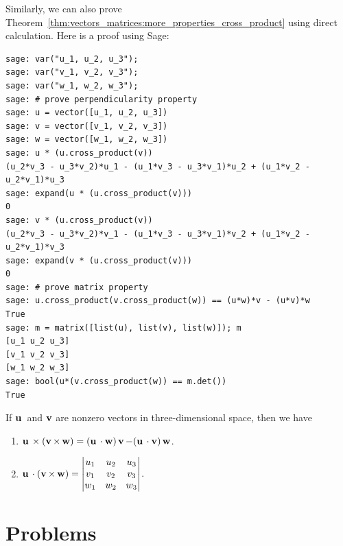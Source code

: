 Similarly, we can also prove
Theorem~\ref{thm:vectors_matrices:more_properties_cross_product} using
direct calculation. Here is a proof using Sage:
%
\begin{lstlisting}
sage: var("u_1, u_2, u_3");
sage: var("v_1, v_2, v_3");
sage: var("w_1, w_2, w_3");
sage: # prove perpendicularity property
sage: u = vector([u_1, u_2, u_3])
sage: v = vector([v_1, v_2, v_3])
sage: w = vector([w_1, w_2, w_3])
sage: u * (u.cross_product(v))
(u_2*v_3 - u_3*v_2)*u_1 - (u_1*v_3 - u_3*v_1)*u_2 + (u_1*v_2 - u_2*v_1)*u_3
sage: expand(u * (u.cross_product(v)))
0
sage: v * (u.cross_product(v))
(u_2*v_3 - u_3*v_2)*v_1 - (u_1*v_3 - u_3*v_1)*v_2 + (u_1*v_2 - u_2*v_1)*v_3
sage: expand(v * (u.cross_product(v)))
0
sage: # prove matrix property
sage: u.cross_product(v.cross_product(w)) == (u*w)*v - (u*v)*w
True
sage: m = matrix([list(u), list(v), list(w)]); m
[u_1 u_2 u_3]
[v_1 v_2 v_3]
[w_1 w_2 w_3]
sage: bool(u*(v.cross_product(w)) == m.det())
True
\end{lstlisting}

\begin{theorem}
\label{thm:vectors_matrices:more_properties_cross_product}
If $\operatorname*{\mathbf{u}}{}$ and $\operatorname*{\mathbf{v}}$ are nonzero vectors in three-dimensional space,
then we have
%
\begin{enumerate}
\item
  $\operatorname*{\mathbf{u}}{} \times (\operatorname*{\mathbf{v}} \times \operatorname*{\mathbf{w}})
  =
  (\operatorname*{\mathbf{u}}{} \cdot \operatorname*{\mathbf{w}}) \operatorname*{\mathbf{v}} - (\operatorname*{\mathbf{u}}{} \cdot \operatorname*{\mathbf{v}}) \operatorname*{\mathbf{w}}$.

\item
  $\operatorname*{\mathbf{u}}{} \cdot (\operatorname*{\mathbf{v}} \times \operatorname*{\mathbf{w}})
  =
  \begin{vmatrix}
    u_1 & u_2 & u_3 \\
    v_1 & v_2 & v_3 \\
    w_1 & w_2 & w_3
  \end{vmatrix}$.
\end{enumerate}
\end{theorem}



\section*{Problems}

